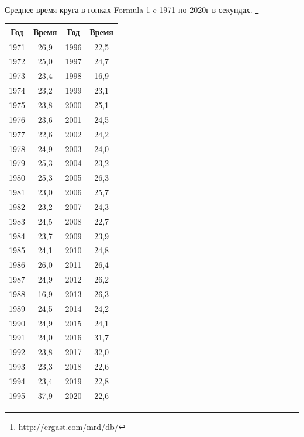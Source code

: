 \documentclass[utf8, a4paper, 14pt, russian, oneside]{book}
\begin{document}


\tableofcontents
\newpage

Среднее время круга в гонках Formula-1 c 1971 по 2020г в секундах. \footnote{http://ergast.com/mrd/db/}
\begin{table}[h!]
    \centering
    \begin{tabular}{|c|c|c|c|}
        \hline
        Год & Время & Год & Время \\ \hline
        1971 & 26,9 & 1996 & 22,5 \\ \hline
        1972 & 25,0 & 1997 & 24,7 \\ \hline
        1973 & 23,4 & 1998 & 16,9 \\ \hline
        1974 & 23,2 & 1999 & 23,1 \\ \hline
        1975 & 23,8 & 2000 & 25,1 \\ \hline
        1976 & 23,6 & 2001 & 24,5 \\ \hline
        1977 & 22,6 & 2002 & 24,2 \\ \hline
        1978 & 24,9 & 2003 & 24,0 \\ \hline
        1979 & 25,3 & 2004 & 23,2 \\ \hline
        1980 & 25,3 & 2005 & 26,3 \\ \hline
        1981 & 23,0 & 2006 & 25,7 \\ \hline
        1982 & 23,2 & 2007 & 24,3 \\ \hline
        1983 & 24,5 & 2008 & 22,7 \\ \hline
        1984 & 23,7 & 2009 & 23,9 \\ \hline
        1985 & 24,1 & 2010 & 24,8 \\ \hline
        1986 & 26,0 & 2011 & 26,4 \\ \hline
        1987 & 24,9 & 2012 & 26,2 \\ \hline
        1988 & 16,9 & 2013 & 26,3 \\ \hline
        1989 & 24,5 & 2014 & 24,2 \\ \hline
        1990 & 24,9 & 2015 & 24,1 \\ \hline
        1991 & 24,0 & 2016 & 31,7 \\ \hline
        1992 & 23,8 & 2017 & 32,0 \\ \hline
        1993 & 23,3 & 2018 & 22,6 \\ \hline
        1994 & 23,4 & 2019 & 22,8 \\ \hline
        1995 & 37,9 & 2020 & 22,6 \\ \hline
    \end{tabular}
\end{table}
\newpage
\end{document}

